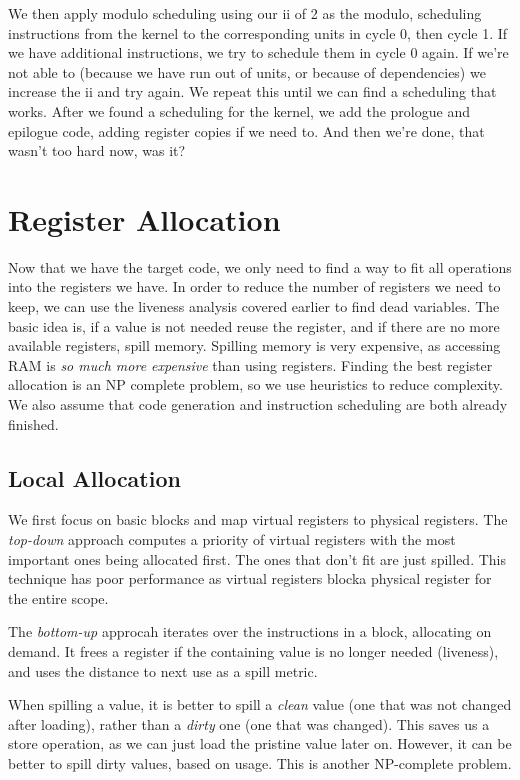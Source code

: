 \documentclass{article}
\begin{document}
We then apply modulo scheduling using our ii of 2 as the modulo, scheduling instructions from the kernel to the corresponding units in cycle 0, then cycle 1.
If we have additional instructions, we try to schedule them in cycle 0 again.
If we're not able to (because we have run out of units, or because of dependencies) we increase the ii and try again.
We repeat this until we can find a scheduling that works.
After we found a scheduling for the kernel, we add the prologue and epilogue code, adding register copies if we need to.
And then we're done, that wasn't too hard now, was it?

\section{Register Allocation}
Now that we have the target code, we only need to find a way to fit all operations into the registers we have.
In order to reduce the number of registers we need to keep, we can use the liveness analysis covered earlier to find dead variables.
The basic idea is, if a value is not needed reuse the register, and if there are no more available registers, spill memory.
Spilling memory is very expensive, as accessing RAM is \emph{so much more expensive} than using registers.
Finding the best register allocation is an NP complete problem, so we use heuristics to reduce complexity.
We also assume that code generation and instruction scheduling are both already finished.

\subsection{Local Allocation}
We first focus on basic blocks and map virtual registers to physical registers.
The \emph{top-down} approach computes a priority of virtual registers with the most important ones being allocated first.
The ones that don't fit are just spilled.
This technique has poor performance as virtual registers blocka physical register for the entire scope.

The \emph{bottom-up} approcah iterates over the instructions in a block, allocating on demand.
It frees a register if the containing value is no longer needed (liveness), and uses the distance to next use as a spill metric.

\begin{keypointbox}
	When spilling a value, it is better to spill a \emph{clean} value (one that was not changed after loading), rather than a \emph{dirty} one (one that was changed).
	This saves us a store operation, as we can just load the pristine value later on.
	However, it can be better to spill dirty values, based on usage.
	This is another NP-complete problem.
\end{keypointbox}
\end{document}
